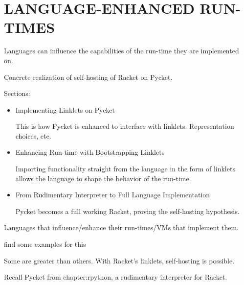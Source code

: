 \chapter[\texorpdfstring{LANGUAGE-ENHANCED RUN-TIMES}
                          {4. Pycket as Full Racket}]{LANGUAGE-ENHANCED RUN-TIMES}
	\label{chapter:pycket}

	\begin{chaptersynopsis}

        Languages can influence the capabilities of the run-time they are implemented on.

		Concrete realization of self-hosting of Racket on Pycket.

        \vspace{2em}

        Sections:
		\begin{itemize}
			\item Implementing Linklets on Pycket

			This is how Pycket is enhanced to interface with linklets. Representation choices, etc.

			\item Enhancing Run-time with Bootstrapping Linklets

			Importing functionality straight from the language in the form of linklets allows the language to shape the behavior of the run-time.

			\item From Rudimentary Interpreter to Full Language Implementation

			Pycket becomes a full working Racket, proving the self-hosting hypothesis.

		\end{itemize}
    \end{chaptersynopsis}

	\begin{paragraph-here}%
		Languages that influence/enhance their run-times/VMs that implement them.

		\begin{todo}
			find some examples for this
		\end{todo}
	\end{paragraph-here}

	\begin{paragraph-here}%
		Some are greater than others. With Racket's linklets, self-hosting is possible.
	\end{paragraph-here}

	\begin{paragraph-here}%
		Recall Pycket from chapter:rpython, a rudimentary interpreter for Racket.	\end{paragraph-here}

